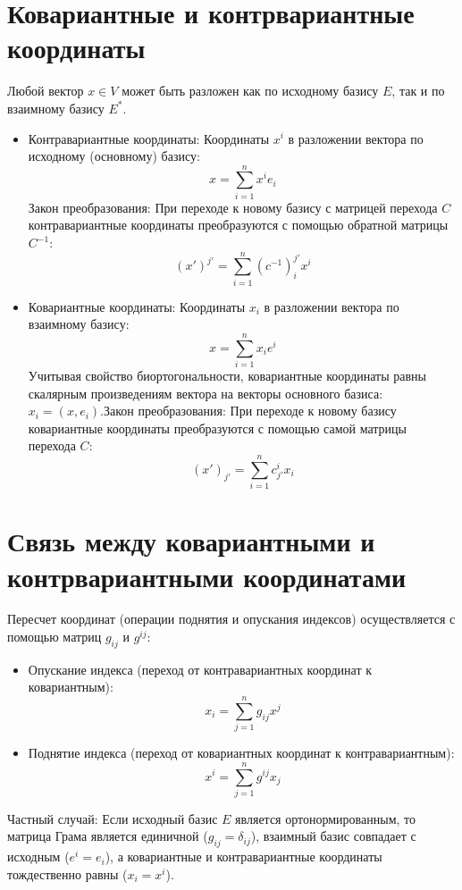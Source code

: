 \documentclass[14pt]{extreport}
\begin{document}
    \section{Ковариантные и контрвариантные координаты}

    Любой вектор $x \in V$ может быть разложен как по исходному базису $E$, так и по взаимному базису $E^*$.

    \begin{itemize}
        \item Контравариантные координаты: Координаты $x^i$ в разложении вектора по исходному (основному) базису:$$x = \sum_{i=1}^n x^i e_i$$Закон преобразования: При переходе к новому базису с матрицей перехода $C$ контравариантные координаты преобразуются с помощью обратной матрицы $C^{-1}$:$$(x')^{j'} = \sum_{i=1}^n (c^{-1})_i^{j'} x^i$$
        \item Ковариантные координаты: Координаты $x_i$ в разложении вектора по взаимному базису:$$x = \sum_{i=1}^n x_i e^i$$Учитывая свойство биортогональности, ковариантные координаты равны скалярным произведениям вектора на векторы основного базиса: $x_i = (x, e_i)$.Закон преобразования: При переходе к новому базису ковариантные координаты преобразуются с помощью самой матрицы перехода $C$:$$(x')_{j'} = \sum_{i=1}^n c_{j'}^i x_i$$
    \end{itemize}

    \section{Связь между ковариантными и контрвариантными координатами}
    Пересчет координат (операции поднятия и опускания индексов) осуществляется с помощью матриц $g_{ij}$ и $g^{ij}$:

    \begin{itemize}
        \item Опускание индекса (переход от контравариантных координат к ковариантным):$$x_i = \sum_{j=1}^n g_{ij} x^j$$
        \item Поднятие индекса (переход от ковариантных координат к контравариантным):$$x^i = \sum_{j=1}^n g^{ij} x_j$$
    \end{itemize}

    Частный случай: Если исходный базис $E$ является ортонормированным, то матрица Грама является единичной ($g_{ij} = \delta_{ij}$), взаимный базис совпадает с исходным ($e^i = e_i$), а ковариантные и контравариантные координаты тождественно равны ($x_i = x^i$).
\end{document}

